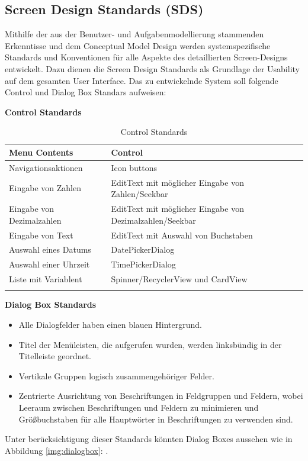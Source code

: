 \subsection{Screen Design Standards (SDS)}
Mithilfe der aus der Benutzer- und Aufgabenmodellierung stammenden Erkenntisse und dem Conceptual Model Design werden systemspezifische Standards und Konventionen für alle Aspekte des detaillierten Screen-Designs entwickelt. Dazu dienen die Screen Design Standards als Grundlage der Usability auf dem gesamten User Interface. Das zu entwickelnde System soll folgende Control und Dialog Box Standars aufweisen:\\
\centerline{\textbf{Control Standards}}
\begin{center}
	\begin{longtable}[H]{p{8cm}p{6cm}}
		\textbf{Menu Contents} & \textbf{Control}\\
		\toprule
		Navigationsaktionen & Icon buttons\\
		Eingabe von Zahlen & EditText mit möglicher Eingabe von Zahlen/Seekbar\\
		Eingabe von Dezimalzahlen &  EditText mit möglicher Eingabe von Dezimalzahlen/Seekbar\\
		Eingabe von Text & EditText mit Auswahl von Buchstaben\\
		Auswahl eines Datums & DatePickerDialog\\
		Auswahl einer Uhrzeit & TimePickerDialog\\
		Liste mit Variablent & Spinner/RecyclerView und CardView\\
		\bottomrule
		\captionsetup{justification=centering}
		\caption{Control Standards}
		\label{tab:controlstandars}
	\end{longtable}
\end{center}
\centerline{\textbf{Dialog Box Standards}}
\begin{itemize}
	\item Alle Dialogfelder haben einen blauen Hintergrund.
	\item Titel der Menüleisten, die aufgerufen wurden, werden linksbündig in der Titelleiste geordnet.
	\item Vertikale Gruppen logisch zusammengehöriger Felder.
	\item Zentrierte Ausrichtung von Beschriftungen in Feldgruppen und Feldern, wobei Leeraum zwischen Beschriftungen und Feldern zu minimieren und Größbuchstaben für alle Hauptwörter in Beschriftungen zu verwenden sind.
\end{itemize}
Unter berücksichtigung dieser Standards könnten Dialog Boxes aussehen wie in Abbildung \ref{img:dialogbox}: .
